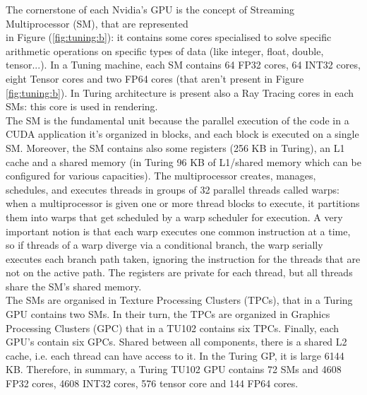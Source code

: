 The cornerstone of each Nvidia's GPU is the concept of Streaming Multiprocessor (SM), that are represented\\in Figure (\ref{fig:tuning:b}): it contains some cores specialised to solve specific arithmetic operations on specific types of data (like integer, float, double, tensor...).
In a Tuning machine, each SM contains 64 FP32 cores, 64 INT32 cores, eight Tensor cores and two FP64 cores (that aren't present in Figure \ref{fig:tuning:b}). In Turing architecture is present also a Ray Tracing cores in each SMs: this core is used in rendering.\\
The SM is the fundamental unit because the parallel execution of the code in a CUDA application it's organized in blocks, and each block is executed on a single SM. 
Moreover, the SM contains also some registers (256 KB in Turing), an L1 cache and a shared memory (in Turing 96 KB of L1/shared memory which can be configured for various capacities). 
The multiprocessor creates, manages, schedules, and executes threads in groups of
32 parallel threads called warps: when a multiprocessor is given one or more thread blocks to execute, it partitions them into warps that get scheduled by a warp scheduler for execution. 
A very important notion is that each warp executes one common instruction at a time, so if threads of a warp diverge via a conditional branch, the warp serially executes each branch path taken, ignoring the instruction for the threads that are not on the active path. 
The registers are private for each thread, but all threads share the SM's shared memory.\\
The SMs are organised in Texture Processing Clusters (TPCs), that in a Turing GPU contains two SMs.
In their turn, the TPCs are organized in Graphics Processing Clusters (GPC) that in a TU102 contains six TPCs. Finally, each GPU's contain six GPCs. Shared between all components, there is a shared L2 cache, i.e. each thread can have access to it. In the Turing GP, it is large 6144 KB.
Therefore, in summary, a Turing TU102 GPU contains 72 SMs and 4608 FP32 cores, 4608 INT32 cores, 576 tensor core and 144 FP64 cores.

